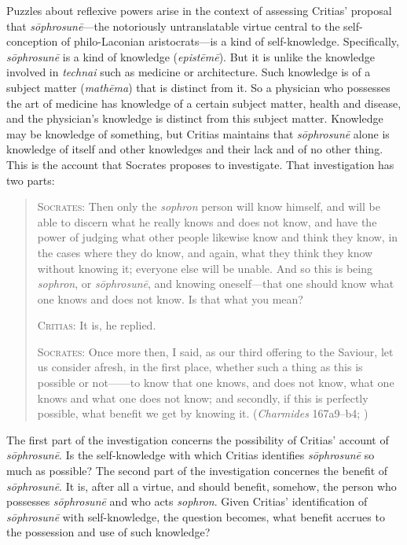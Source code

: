 Puzzles about reflexive powers arise in the context of assessing Critias' proposal that \emph{sōphrosunē}—the notoriously untranslatable virtue central to the self-conception of philo-Laconian aristocrats—is a kind of self-knowledge. Specifically, \emph{sōphrosunē} is a kind of knowledge (\emph{epistēmē}). But it is unlike the knowledge involved in \emph{technai} such as medicine or architecture. Such knowledge is of a subject matter (\emph{mathēma}) that is distinct from it. So a physician who possesses the art of medicine has knowledge of a certain subject matter, health and disease, and the physician's knowledge is distinct from this subject matter. Knowledge may be knowledge of something, but Critias maintains that \emph{sōphrosunē} alone is knowledge of itself and other knowledges and their lack and of no other thing. This is the account that Socrates proposes to investigate. That investigation has two parts:
\begin{quotation}
	\textsc{Socrates}: Then only the \emph{sophron} person will know himself, and will be able to discern what he really knows and does not know, and have the power of judging what other people likewise know and think they know, in the cases where they do know, and again, what they think they know without knowing it; everyone else will be unable. And so this is being \emph{sophron}, or \emph{sōphrosunē}, and knowing oneself—that one should know what one knows and does not know. Is that what you mean?
	
	\textsc{Critias}: It is, he replied.
	
	\textsc{Socrates}: Once more then, I said, as our third offering to the Saviour, let us consider afresh, in the first place, whether such a thing as this is possible or not——to know that one knows, and does not know, what one knows and what one does not know; and secondly, if this is perfectly possible, what benefit we get by knowing it. (\emph{Charmides} 167a9–b4; \citealt[57]{Lamb:1927qw})
\end{quotation}
The first part of the investigation concerns the possibility of Critias' account of \emph{sōphrosunē}. Is the self-knowledge with which Critias identifies \emph{sōphrosunē} so much as possible? The second part of the investigation concernes the benefit of \emph{sōphrosunē}. It is, after all a virtue, and should benefit, somehow, the person who possesses \emph{sōphrosunē} and who acts \emph{sophron}. Given Critias' identification of \emph{sōphrosunē} with self-knowledge, the question becomes, what benefit accrues to the possession and use of such knowledge?
 
